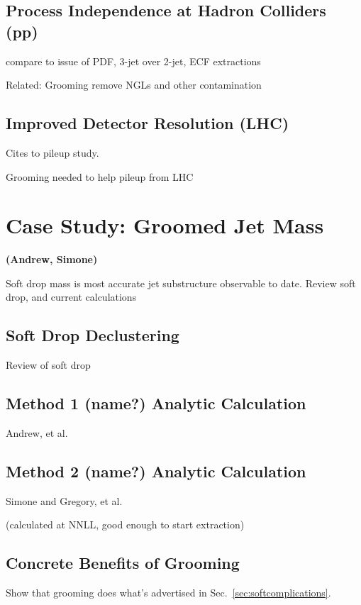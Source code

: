 \documentclass[11pt,letterpaper]{article}
\DeclareRobustCommand{\Sec}[1]{Sec.~\ref{#1}}
\newcommand{\info}[1]{\textbf{\textcolor{mildred}{(#1)}}}
\begin{document}
\subsection{Process Independence at Hadron Colliders (pp)}

compare to issue of PDF, 3-jet over 2-jet, ECF extractions

Related:  Grooming remove NGLs and other contamination


\subsection{Improved Detector Resolution (LHC)}

Cites to pileup study.

Grooming needed to help pileup from LHC

\section{Case Study: Groomed Jet Mass}

\info{Andrew, Simone}

Soft drop mass is most accurate jet substructure observable to date.  Review soft drop, and current calculations

\subsection{Soft Drop Declustering}

Review of soft drop

\subsection{Method 1 (name?) Analytic Calculation}

Andrew, et al.

\subsection{Method 2 (name?)  Analytic Calculation}

Simone and Gregory, et al.

(calculated at NNLL, good enough to start extraction)

\subsection{Concrete Benefits of Grooming}

Show that grooming does what's advertised in \Sec{sec:softcomplications}.
\end{document}
